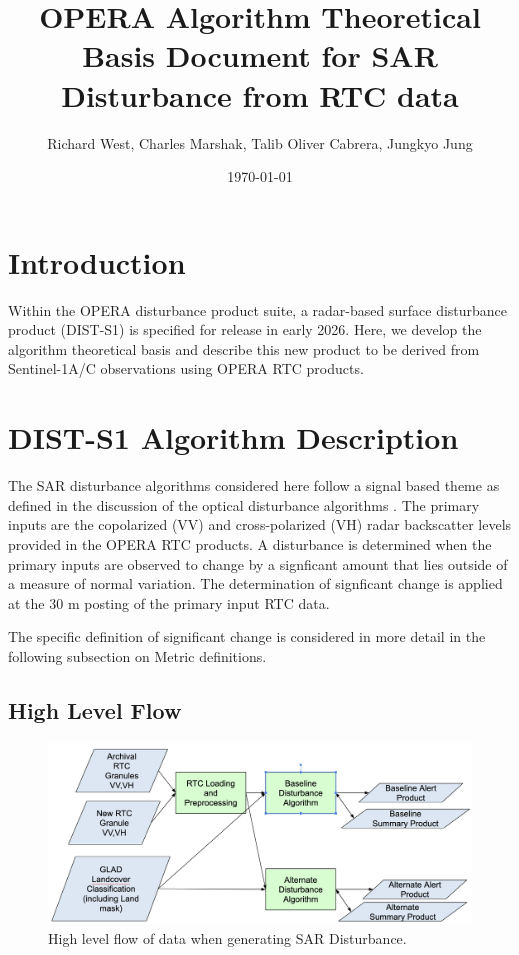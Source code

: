 \documentclass[11pt]{article}
\title{OPERA Algorithm Theoretical Basis Document for SAR Disturbance from RTC data}
\author{Richard West, Charles Marshak, Talib Oliver Cabrera, Jungkyo Jung}
\date{\today}
\newcommand{\figonesize}{6.0in}
\begin{document}

\thispagestyle{empty}
\newpage
\setcounter{page}{1}
\thispagestyle{fancy}




\setcounter{tocdepth}{10}
\renewcommand\contentsname{}
\tableofcontents
\newpage

\setcounter{page}{1}

\section{Introduction}

Within the OPERA disturbance product suite,
a radar-based surface disturbance product (DIST-S1)
is specified for release in early 2026.
Here, we develop the algorithm theoretical basis and describe this
new product to be derived from Sentinel-1A/C observations using
OPERA RTC products.

\section{DIST-S1 Algorithm Description}

The SAR disturbance algorithms considered here follow a signal based theme
as defined in the discussion of the optical disturbance algorithms
\cite{dist_hls_atbd}.
The primary inputs are the copolarized (VV) and cross-polarized (VH)
radar backscatter levels provided in the OPERA RTC products.
A disturbance is determined when the primary inputs are observed to change
by a signficant amount that lies outside of a measure of normal variation.
The determination of signficant change is applied at the 30 m posting
of the primary input RTC data.

The specific definition of significant change is considered in more
detail in the following subsection on Metric definitions.

\subsection{High Level Flow}

\begin{figure}[!t]
\centering
\includegraphics[width=\figonesize]{fig/high_level_flow.png}
\caption{High level flow of data when generating SAR Disturbance.}
\label{fig_high_level_flow}
\end{figure}
\end{document}
